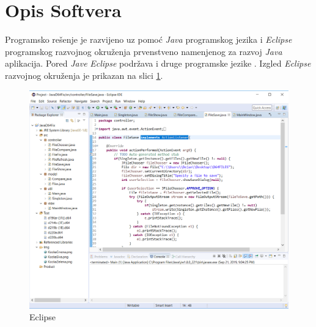 \section{Opis Softvera}

Programsko rešenje je razvijeno uz pomoć \textit{Java} programskog jezika i  \textit{Eclipse} programskog razvojnog okruženja prvenstveno namenjenog za razvoj \textit{Java} aplikacija. Pored \textit{Jave} \textit{Eclipse} podržava i druge programske jezike \cite{Eclipse}. Izgled \textit{Eclipse} razvojnog okruženja je prikazan na slici \ref{img:eclipse}.

\begin{figure}[ht]
\begin{center}
\includegraphics[width=\textwidth]{img/EclipseIDE.png}
\caption{Eclipse}
\label{img:eclipse}
\end{center}
\end{figure}